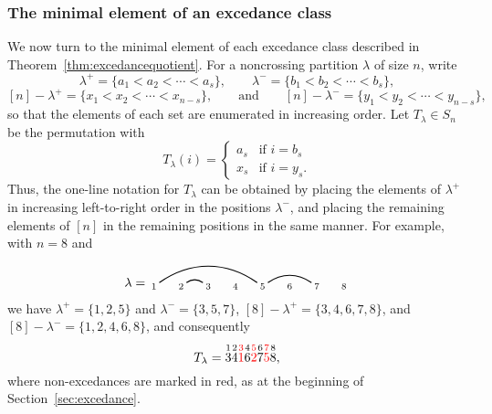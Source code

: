 \documentclass[12pt]{amsart}
\theoremstyle{definition}
\theoremstyle{remark}
\numberwithin{equation}{section}
\renewcommand{\setminus}{-}
\begin{document}
\subsubsection{The minimal element of an excedance class}
\label{sec:ex2.1}

We now turn to the minimal element of each excedance class described in Theorem~\ref{thm:excedancequotient}.  For a noncrossing partition $\lambda$ of size $n$, write 
\[
\lambda^{+} = \{a_{1} < a_{2} < \cdots < a_{s}\},
\qquad
\lambda^{-} = \{b_{1} < b_{2} < \cdots < b_{s}\},
\]
\[
[n] \setminus \lambda^{+} = \{x_{1} < x_{2} < \cdots < x_{n-s}\},
\qquad\text{and}\qquad
[n] \setminus \lambda^{-} = \{y_{1} < y_{2} < \cdots < y_{n-s}\},
\]
so that the elements of each set are enumerated in increasing order.  Let $T_{\lambda} \in S_{n}$ be the permutation with
\[
T_{\lambda}(i) = \begin{cases} a_{s} & \text{if $i = b_{s}$} \\ x_{s} & \text{if $i = y_{s}$.}  \end{cases}
\]
Thus, the one-line notation for $T_{\lambda}$ can be obtained by placing the elements of $\lambda^{+}$ in increasing left-to-right order in the positions $\lambda^{-}$, and placing the remaining elements of $[n]$ in the remaining positions in the same manner.  For example, with $n = 8$ and 
\[
\lambda = \begin{tikzpicture}[scale = 0.75, baseline = 0.75*-0.2]
\foreach \x in {1, ..., 8}{\draw[fill] (\x - 1, 0) node[inner sep = 2pt] (\x) {$\scriptstyle \x$};}
\foreach \i\j in {1/5, 2/3, 5/7}{\draw[thick] (\i) to[out = 35, in = 145] (\j);}
\end{tikzpicture}
\]
we have $\lambda^{+} = \{1, 2, 5\}$ and $\lambda^{-} = \{3, 5, 7\}$, $[8] \setminus \lambda^{+} = \{3, 4, 6, 7, 8\}$, and $[8] \setminus \lambda^{-} = \{1, 2, 4, 6, 8\}$, and consequently
\[
T_{\lambda} = \overset{1}{3} \overset{2}{4} {\color{red} \overset{3}{1}} \overset{4}{6} {\color{red} \overset{5}{2}} \overset{6}{7} {\color{red} \overset{7}{5}} \overset{8}{8},
\]
where non-excedances are marked in red, as at the beginning of Section~\ref{sec:excedance}.
\end{document}
